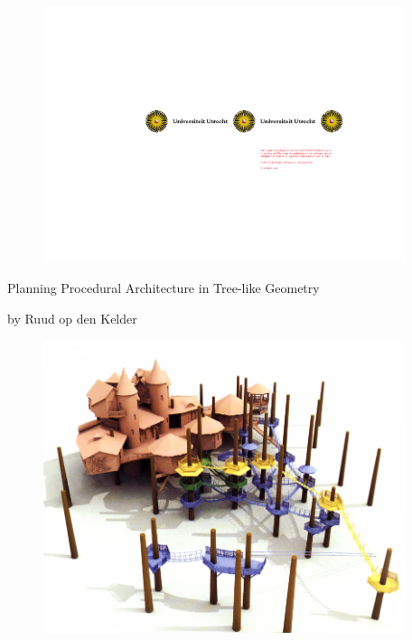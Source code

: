 
\begin{titlepage}
   
\begin{figure}[htbp]
\centering
\includegraphics[width=400px]{images/UULogoSolRight.pdf}
\end{figure}
   
   
    	\begin{center}
    			\LARGE{Planning Procedural Architecture in Tree-like Geometry}
    	\end{center}
    	
   	 	\begin{center}
    			by Ruud op den Kelder
    	\end{center}
    	
    	
\begin{figure}[htbp]
\centering
\includegraphics[width=400px]{images/titlepage_image.png}
\end{figure}
   
   
\end{titlepage} 
